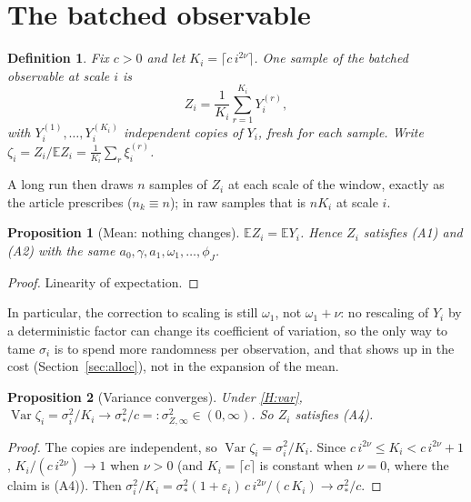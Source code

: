 \documentclass[11pt]{article}
\newtheorem{proposition}{Proposition}
\newtheorem{definition}{Definition}
\newcommand{\E}{\mathbb{E}}
\newcommand{\Var}{\operatorname{Var}}
\begin{document}
\section{The batched observable}

\begin{definition}\label{def:batch}
Fix $c>0$ and let $K_i=\lceil c\,i^{2\nu}\rceil$. One sample of the batched
observable at scale $i$ is
\[
  Z_i=\frac1{K_i}\sum_{r=1}^{K_i}Y_i^{(r)},
\]
with $Y_i^{(1)},\dots,Y_i^{(K_i)}$ independent copies of $Y_i$, fresh for
each sample. Write $\zeta_i=Z_i/\E Z_i=\frac1{K_i}\sum_r\xi_i^{(r)}$.
\end{definition}

\noindent A long run then draws $n$ samples of $Z_i$ at each scale of the
window, exactly as the article prescribes ($n_k\equiv n$); in raw samples
that is $nK_i$ at scale $i$.

\begin{proposition}[Mean: nothing changes]\label{prop:mean}
$\E Z_i=\E Y_i$. Hence $Z_i$ satisfies (A1) and (A2) with the same
$a_0,\gamma,a_1,\omega_1,\dots,\phi_J$.
\end{proposition}

\begin{proof}
Linearity of expectation.
\end{proof}

\noindent In particular, the correction to scaling is still $\omega_1$, not
$\omega_1+\nu$: no rescaling of $Y_i$ by a deterministic factor can change its
coefficient of variation, so the only way to tame $\sigma_i$ is to spend more
randomness per observation, and that shows up in the cost
(Section~\ref{sec:alloc}), not in the expansion of the mean.

\begin{proposition}[Variance converges]\label{prop:var}
Under \ref{H:var}, $\Var\zeta_i=\sigma_i^2/K_i\to\sigma_*^2/c=:\sigma_{Z,\infty}^2\in(0,\infty)$.
So $Z_i$ satisfies (A4).
\end{proposition}

\begin{proof}
The copies are independent, so $\Var\zeta_i=\sigma_i^2/K_i$. Since
$c\,i^{2\nu}\le K_i<c\,i^{2\nu}+1$, $K_i/(c\,i^{2\nu})\to1$ when $\nu>0$
(and $K_i=\lceil c\rceil$ is constant when $\nu=0$, where the claim is (A4)).
Then $\sigma_i^2/K_i=\sigma_*^2(1+\varepsilon_i)\,c\,i^{2\nu}/(c\,K_i)\to\sigma_*^2/c$.
\end{proof}
\end{document}
